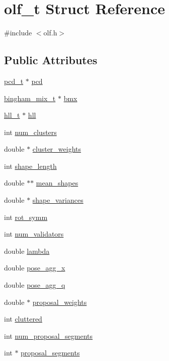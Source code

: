 \hypertarget{structolf__t}{
\section{olf\_\-t Struct Reference}
\label{structolf__t}
}


{\ttfamily \#include $<$olf.h$>$}

\subsection*{Public Attributes}
\begin{DoxyCompactItemize}
\item 
\hyperlink{structpcd__t}{pcd\_\-t} $\ast$ \hyperlink{structolf__t_aa248fc7966779ca474911b52ef54d591}{pcd}
\item 
\hyperlink{structbingham__mix__t}{bingham\_\-mix\_\-t} $\ast$ \hyperlink{structolf__t_a8f243ce482e7ee6734f5ef78a9e90b40}{bmx}
\item 
\hyperlink{structhll__t}{hll\_\-t} $\ast$ \hyperlink{structolf__t_a7a344136743e02ce08dfa841bf3a8afe}{hll}
\item 
int \hyperlink{structolf__t_a4f42e7b13364e04fd4b35da487acc7ae}{num\_\-clusters}
\item 
double $\ast$ \hyperlink{structolf__t_aa6f327d893d0e668ced4cc01a9a3b6b6}{cluster\_\-weights}
\item 
int \hyperlink{structolf__t_a324ef3ce6e8c10036b1e11ee6af0a833}{shape\_\-length}
\item 
double $\ast$$\ast$ \hyperlink{structolf__t_a00c5ee0e3af90b16fc060f72e7411296}{mean\_\-shapes}
\item 
double $\ast$ \hyperlink{structolf__t_a995e14cf5dc74ff0d953b2c0c0ba6605}{shape\_\-variances}
\item 
int \hyperlink{structolf__t_a6dd43baa1efad15b1fee44b47e627af9}{rot\_\-symm}
\item 
int \hyperlink{structolf__t_adc48782a8be5cb53199f7c6fff6ba1d0}{num\_\-validators}
\item 
double \hyperlink{structolf__t_ac6e226fa1e02d59c46fb9421d2c9139b}{lambda}
\item 
double \hyperlink{structolf__t_a6cf73c2f9069a7625cad89eb760290f3}{pose\_\-agg\_\-x}
\item 
double \hyperlink{structolf__t_ab386aeb8d8471604a0e3d8e6a25cfcfa}{pose\_\-agg\_\-q}
\item 
double $\ast$ \hyperlink{structolf__t_a679ce77cdfe562926b008b2b30596047}{proposal\_\-weights}
\item 
int \hyperlink{structolf__t_a1d5c1ab4c411ce11b47cd868523aa156}{cluttered}
\item 
int \hyperlink{structolf__t_a956e7e967d60ade1e373faa8de8d4dc5}{num\_\-proposal\_\-segments}
\item 
int $\ast$ \hyperlink{structolf__t_aa28705cbd4736e5e4d1c890b9b67c8ef}{proposal\_\-segments}
\end{DoxyCompactItemize}


